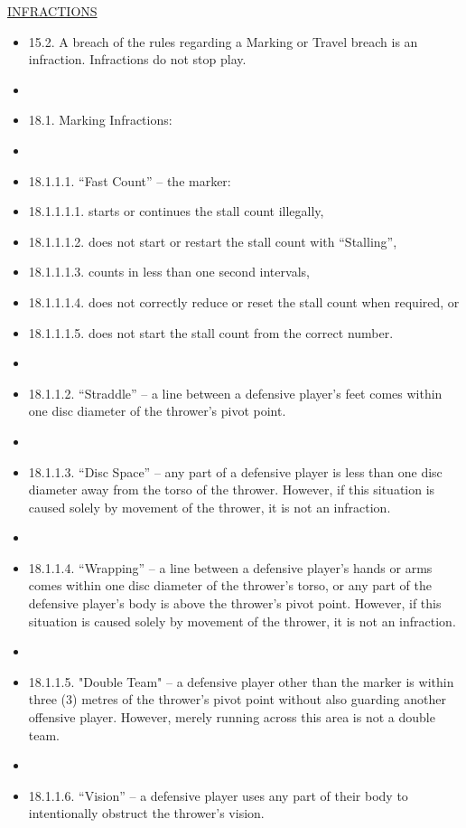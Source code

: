 \begin{center}\underline{\uppercase{infractions}}\end{center}

\begin{itemize}
    \item 15.2. A breach of the rules regarding a Marking or Travel breach is an infraction. Infractions do not stop play.
    \item 
    \item 18.1. Marking Infractions:
    \item 
    \item 18.1.1.1. “Fast Count” – the marker:
    \item 18.1.1.1.1. starts or continues the stall count illegally,
    \item 18.1.1.1.2. does not start or restart the stall count with “Stalling”,
    \item 18.1.1.1.3. counts in less than one second intervals,
    \item 18.1.1.1.4. does not correctly reduce or reset the stall count when required, or
    \item 18.1.1.1.5. does not start the stall count from the correct number.
    \item 
    \item 18.1.1.2. “Straddle” – a line between a defensive player’s feet comes within one disc diameter of the thrower’s pivot point.
    \item 
    \item 18.1.1.3. “Disc Space” – any part of a defensive player is less than one disc diameter away from the torso of the thrower. However, if this situation is caused solely by movement of the thrower, it is not an infraction.
    \item 
    \item 18.1.1.4. “Wrapping” – a line between a defensive player’s hands or arms comes within one disc diameter of the thrower’s torso, or any part of the defensive player’s body is above the thrower’s pivot point. However, if this situation is caused solely by movement of the thrower, it is not an infraction.
    \item 
    \item 18.1.1.5. "Double Team" – a defensive player other than the marker is within three (3) metres of the thrower's pivot point without also guarding another offensive player. However, merely running across this area is not a double team.
    \item 
    \item 18.1.1.6. “Vision” – a defensive player uses any part of their body to intentionally obstruct the thrower’s vision.

\end{itemize}
